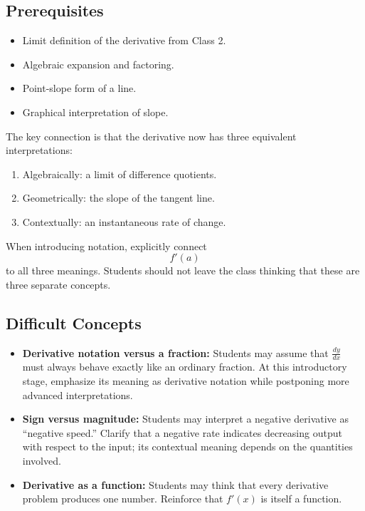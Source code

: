 \documentclass{article}
\begin{document}
\subsection*{Prerequisites}

\begin{itemize}
    \item Limit definition of the derivative from Class 2.
    \item Algebraic expansion and factoring.
    \item Point-slope form of a line.
    \item Graphical interpretation of slope.
\end{itemize}

\begin{tcolorbox}[title=Connecting to Prior Learning]
The key connection is that the derivative now has three equivalent interpretations:

\begin{enumerate}
    \item Algebraically: a limit of difference quotients.
    \item Geometrically: the slope of the tangent line.
    \item Contextually: an instantaneous rate of change.
\end{enumerate}

When introducing notation, explicitly connect
\[
f'(a)
\]
to all three meanings. Students should not leave the class thinking that these are three separate concepts.
\end{tcolorbox}

\subsection*{Difficult Concepts}

\begin{itemize}
    \item \textbf{Derivative notation versus a fraction:} Students may assume that $\frac{dy}{dx}$ must always behave exactly like an ordinary fraction. At this introductory stage, emphasize its meaning as derivative notation while postponing more advanced interpretations.
    
    \item \textbf{Sign versus magnitude:} Students may interpret a negative derivative as ``negative speed.'' Clarify that a negative rate indicates decreasing output with respect to the input; its contextual meaning depends on the quantities involved.
    
    \item \textbf{Derivative as a function:} Students may think that every derivative problem produces one number. Reinforce that $f'(x)$ is itself a function.
\end{itemize}
\end{document}
